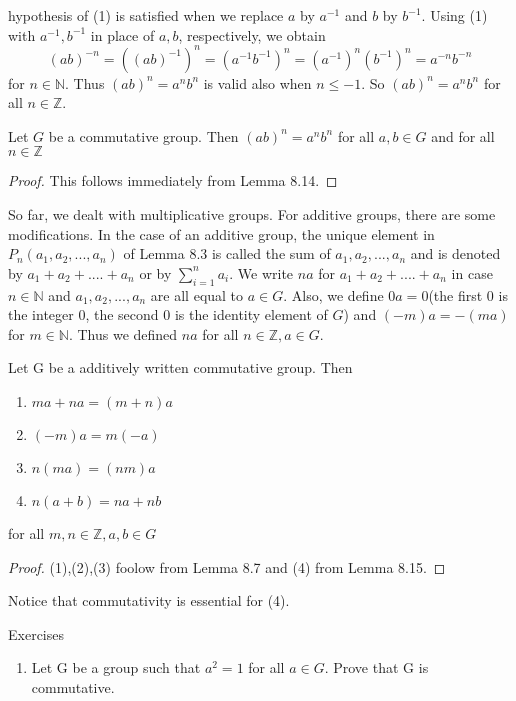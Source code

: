 \documentclass[11pt]{amsbook}
\begin{document}
hypothesis of (1) is satisfied when we replace $a$ by $a^{-1}$ and $b$ by $b^{-1}$. Using (1) with $a^{-1} , b^{-1}$ in place
of $a,b$, respectively, we obtain \[(ab)^{-n} = ((ab)^{-1})^n = (a^{-1} b^{-1})^n = (a^{-1})^n (b^{-1})^n = a^{-n} b^{-n} \]
for $n \in \mathbb{N} $. Thus $(ab)^n = a^n b^n$ is valid also when $n \leq -1$. So $(ab)^n = a^n b^n$ for all $n\in \mathbb{Z}$.

\begin{lem}
Let $G$ be a commutative group. Then $(ab)^n = a^n b^n$ for all $a,b\in G $ and for all $n\in \mathbb{Z}$
\end{lem}

\begin{proof}
This follows immediately from Lemma 8.14.
\end{proof}
So far, we dealt with multiplicative groups. For additive groups, there
are some modifications. In the case of an  additive group, the unique element in $P_n (a_1 , a_2 ,..., a_n)$
of Lemma 8.3 is called the sum of $a_1 , a_2 ,..., a_n$ and is denoted by $a_1 + a_2 +....+ a_n$ or by $\sum_{i=1}^n a_i$.
We write $na$ for $a_1 + a_2 +....+ a_n$ in case $n\in \mathbb{N}$ and $a_1 , a_2 ,..., a_n$ are all equal to $a\in G$. Also, 
we define $0a=0$(the first 0 is the integer 0, the second 0 is the identity element of $G$) and $(-m)a = -(ma)$
for $m\in \mathbb{N}$. Thus we defined $na$ for all $n\in \mathbb{Z} , a\in G $.

\begin{lem}
Let G be a additively written commutative group. Then
\begin{enumerate}
	\item $ma+na=(m+n)a$
	\item $(-m)a = m(-a)$
	\item $n(ma)=(nm)a$
	\item $n(a+b)=na+nb$
\end{enumerate}
for all $m,n\in \mathbb{Z} ,a,b\in G$
\end{lem}

\begin{proof}
(1),(2),(3) foolow from Lemma 8.7 and (4) from Lemma 8.15.
\end{proof}

Notice that commutativity is essential for (4).
\par

\begin{center}
Exercises
\end{center}

\begin{enumerate}
\item Let G be a group such that $a^2=1$ for all $a\in G$. Prove that G is commutative.
\end{enumerate}



\end{document}
